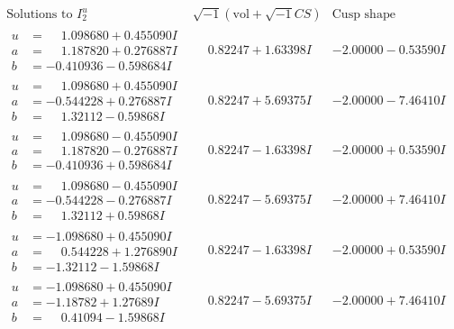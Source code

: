 \documentclass[1p]{elsarticle_modified}
\theoremstyle{definition}
\newcommand{\I}{\sqrt{-1}}
\begin{document}
$$\begin{array}{c|c|c}  
\text{Solutions to }I^u_{2}& \I (\text{vol} + \sqrt{-1}CS) & \text{Cusp shape}\\
 \hline 
\begin{aligned}
u &= \phantom{-}1.098680 + 0.455090 I \\
a &= \phantom{-}1.187820 + 0.276887 I \\
b &= -0.410936 - 0.598684 I\end{aligned}
 & \phantom{-}0.82247 + 1.63398 I & -2.00000 - 0.53590 I \\ \hline\begin{aligned}
u &= \phantom{-}1.098680 + 0.455090 I \\
a &= -0.544228 + 0.276887 I \\
b &= \phantom{-}1.32112 - 0.59868 I\end{aligned}
 & \phantom{-}0.82247 + 5.69375 I & -2.00000 - 7.46410 I \\ \hline\begin{aligned}
u &= \phantom{-}1.098680 - 0.455090 I \\
a &= \phantom{-}1.187820 - 0.276887 I \\
b &= -0.410936 + 0.598684 I\end{aligned}
 & \phantom{-}0.82247 - 1.63398 I & -2.00000 + 0.53590 I \\ \hline\begin{aligned}
u &= \phantom{-}1.098680 - 0.455090 I \\
a &= -0.544228 - 0.276887 I \\
b &= \phantom{-}1.32112 + 0.59868 I\end{aligned}
 & \phantom{-}0.82247 - 5.69375 I & -2.00000 + 7.46410 I \\ \hline\begin{aligned}
u &= -1.098680 + 0.455090 I \\
a &= \phantom{-}0.544228 + 1.276890 I \\
b &= -1.32112 - 1.59868 I\end{aligned}
 & \phantom{-}0.82247 - 1.63398 I & -2.00000 + 0.53590 I \\ \hline\begin{aligned}
u &= -1.098680 + 0.455090 I \\
a &= -1.18782 + 1.27689 I \\
b &= \phantom{-}0.41094 - 1.59868 I\end{aligned}
 & \phantom{-}0.82247 - 5.69375 I & -2.00000 + 7.46410 I \\ \hline\begin{aligned}

\end{aligned}
\end{array}$$
\end{document}
